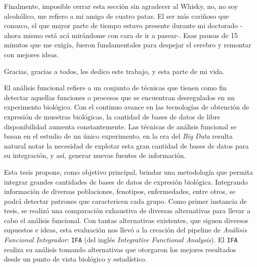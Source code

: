 \documentclass[12pt,twoside]{reedthesis}
\begin{document}
\begin{acknowledgements}
    \par
    
    Finalmente, imposible cerrar esta sección sin agradecer al Whisky, no, no soy alcohólico, me refiero a mi amigo de cuatro patas. El ser más cariñoso que conozco, el que mayor parte de tiempo estuvo presente durante mi doctorado -ahora mismo está acá mirándome con cara de ir a pasear-. Esas pausas de 15 minutos que me exigía, fueron fundamentales para despejar el cerebro y remontar con mejores ideas.
    
    \par
    
    Gracias, gracias a todos, les dedico este trabajo, y esta parte de mi vida.
  \end{acknowledgements}
  \begin{resumen}
    \par
    
    El análisis funcional refiere a un conjunto de técnicas que tienen como fin detectar aquellas funciones o procesos que se encuentran desregulados en un experimento biológico. Con el continuo avance en las tecnologías de obtención de expresión de muestras biológicas, la cantidad de bases de datos de libre disponibilidad aumenta constantemente. Las técnicas de análisis funcional se basan en el estudio de un único experimento, en la era del \emph{Big Data} resulta natural notar la necesidad de explotar esta gran cantidad de bases de datos para su integración, y así, generar nuevas fuentes de información.
    
    \par
    
    Esta tesis propone, como objetivo principal, brindar una metodología que permita integrar grandes cantidades de bases de datos de expresión biológica. Integrando información de diversas poblaciones, fenotipos, enfermedades, entre otros, se podrá detectar patrones que caractericen cada grupo. Como primer instancia de tesis, se realizó una comparación exhaustiva de diversas alternativas para llevar a cabo el análisis funcional. Con tantas alternativas existentes, que siguen diversos supuestos e ideas, esta evaluación nos llevó a la creación del pipeline de \emph{Análisis Funcional Integrador}: \texttt{IFA} (del inglés \emph{Integrative Functional Analysis}). El \texttt{IFA} realiza su análisis tomando alternativas que otorgaron los mejores resultados desde un punto de vista biológico y estadístico.
    
    \par
    

\end{resumen}
\end{document}
